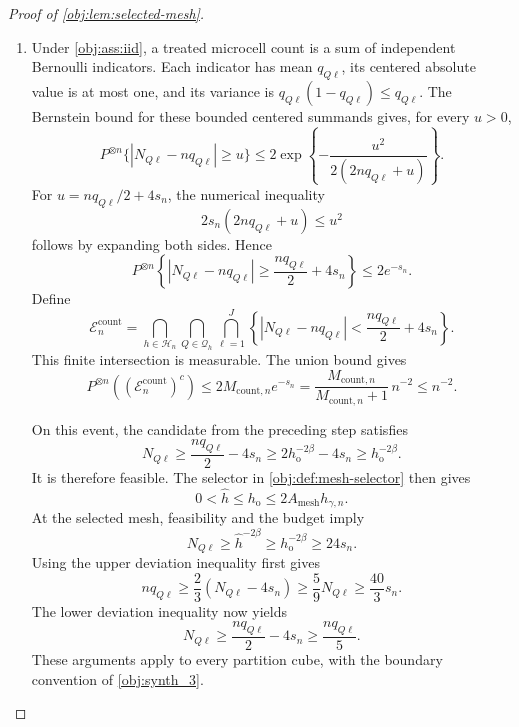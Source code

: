 \begin{proof}[Proof of \cref{obj:lem:selected-mesh}]
\begin{enumerate}
Finally, the oracle balance identity is
\[
nh_{\gamma,n}^{2\beta+D_\gamma}=1.
\]
Thus every microcell at \(h_{\mathrm{o}}\) satisfies
\[
\begin{aligned}
nq_{Q\ell}h_{\mathrm{o}}^{2\beta}
&\ge n\kappa_*h_{\mathrm{o}}^{2\beta+D_\gamma}\\
&\ge
\kappa_*A_{\mathrm{mesh}}^{2\beta+D_\gamma}
nh_{\gamma,n}^{2\beta+D_\gamma}
\ge4,
\end{aligned}
\]
or equivalently \(nq_{Q\ell}\ge4h_{\mathrm{o}}^{-2\beta}\).

\item Under \cref{obj:ass:iid}, a treated microcell count is a sum of
independent Bernoulli indicators. Each indicator has mean \(q_{Q\ell}\),
its centered absolute value is at most one, and its variance is
\(q_{Q\ell}(1-q_{Q\ell})\le q_{Q\ell}\). The Bernstein bound for these
bounded centered summands gives, for every \(u>0\),
\[
P^{\otimes n}\{|N_{Q\ell}-nq_{Q\ell}|\ge u\}
\le
2\exp\!\left\{-\frac{u^2}{2(2nq_{Q\ell}+u)}\right\}.
\]
For \(u=nq_{Q\ell}/2+4s_n\), the numerical inequality
\[
2s_n\left(2nq_{Q\ell}+u\right)\le u^2
\]
follows by expanding both sides. Hence
\[
P^{\otimes n}\left\{
|N_{Q\ell}-nq_{Q\ell}|
\ge\frac{nq_{Q\ell}}2+4s_n
\right\}\le2e^{-s_n}.
\]
Define
\[
\mathcal E_n^{\mathrm{count}}
=
\bigcap_{h\in\mathcal H_n}
\bigcap_{Q\in\mathcal Q_h}
\bigcap_{\ell=1}^{J}
\left\{
|N_{Q\ell}-nq_{Q\ell}|
<\frac{nq_{Q\ell}}2+4s_n
\right\}.
\]
This finite intersection is measurable. The union bound gives
\[
P^{\otimes n}\!\left((\mathcal E_n^{\mathrm{count}})^c\right)
\le2M_{\mathrm{count},n}e^{-s_n}
=
\frac{M_{\mathrm{count},n}}{M_{\mathrm{count},n}+1}\,n^{-2}
\le n^{-2}.
\]

On this event, the candidate from the preceding step satisfies
\[
N_{Q\ell}
\ge\frac{nq_{Q\ell}}2-4s_n
\ge2h_{\mathrm{o}}^{-2\beta}-4s_n
\ge h_{\mathrm{o}}^{-2\beta}.
\]
It is therefore feasible. The selector in \cref{obj:def:mesh-selector}
then gives
\[
0<\widehat h\le h_{\mathrm{o}}
\le2A_{\mathrm{mesh}}h_{\gamma,n}.
\]
At the selected mesh, feasibility and the budget imply
\[
N_{Q\ell}\ge\widehat h^{-2\beta}
\ge h_{\mathrm{o}}^{-2\beta}\ge24s_n.
\]
Using the upper deviation inequality first gives
\[
nq_{Q\ell}
\ge\frac23(N_{Q\ell}-4s_n)
\ge\frac59N_{Q\ell}
\ge\frac{40}{3}s_n.
\]
The lower deviation inequality now yields
\[
N_{Q\ell}
\ge\frac{nq_{Q\ell}}2-4s_n
\ge\frac{nq_{Q\ell}}5.
\]
These arguments apply to every partition cube, with the boundary
convention of \cref{obj:synth_3}.


\end{enumerate}
\end{proof}
